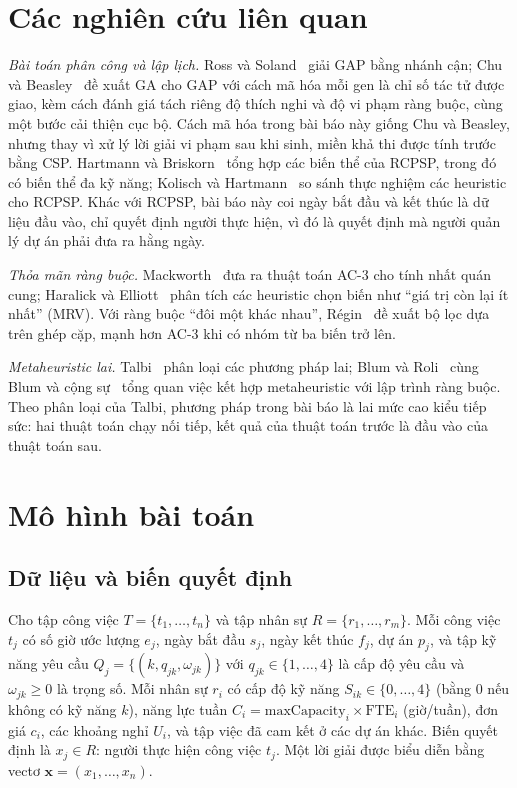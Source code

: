 \documentclass{IEEEtran}
\begin{document}
\section{Các nghiên cứu liên quan}
\label{sec:related}

\textit{Bài toán phân công và lập lịch.} Ross và Soland~\cite{ross1975} giải GAP bằng nhánh cận; Chu và Beasley~\cite{chu1997} đề xuất GA cho GAP với cách mã hóa mỗi gen là chỉ số tác tử được giao, kèm cách đánh giá tách riêng độ thích nghi và độ vi phạm ràng buộc, cùng một bước cải thiện cục bộ. Cách mã hóa trong bài báo này giống Chu và Beasley, nhưng thay vì xử lý lời giải vi phạm sau khi sinh, miền khả thi được tính trước bằng CSP. Hartmann và Briskorn~\cite{hartmann2010} tổng hợp các biến thể của RCPSP, trong đó có biến thể đa kỹ năng; Kolisch và Hartmann~\cite{kolisch2006} so sánh thực nghiệm các heuristic cho RCPSP. Khác với RCPSP, bài báo này coi ngày bắt đầu và kết thúc là dữ liệu đầu vào, chỉ quyết định người thực hiện, vì đó là quyết định mà người quản lý dự án phải đưa ra hằng ngày.

\textit{Thỏa mãn ràng buộc.} Mackworth~\cite{mackworth1977} đưa ra thuật toán AC-3 cho tính nhất quán cung; Haralick và Elliott~\cite{haralick1980} phân tích các heuristic chọn biến như ``giá trị còn lại ít nhất'' (MRV). Với ràng buộc ``đôi một khác nhau'', Régin~\cite{regin1994} đề xuất bộ lọc dựa trên ghép cặp, mạnh hơn AC-3 khi có nhóm từ ba biến trở lên.

\textit{Metaheuristic lai.} Talbi~\cite{talbi2002} phân loại các phương pháp lai; Blum và Roli~\cite{blum2003} cùng Blum và cộng sự~\cite{blum2011} tổng quan việc kết hợp metaheuristic với lập trình ràng buộc. Theo phân loại của Talbi, phương pháp trong bài báo là lai mức cao kiểu tiếp sức: hai thuật toán chạy nối tiếp, kết quả của thuật toán trước là đầu vào của thuật toán sau.

\section{Mô hình bài toán}
\label{sec:model}

\subsection{Dữ liệu và biến quyết định}

Cho tập công việc $T=\{t_1,\dots,t_n\}$ và tập nhân sự $R=\{r_1,\dots,r_m\}$. Mỗi công việc $t_j$ có số giờ ước lượng $e_j$, ngày bắt đầu $s_j$, ngày kết thúc $f_j$, dự án $p_j$, và tập kỹ năng yêu cầu $Q_j=\{(k, q_{jk}, \omega_{jk})\}$ với $q_{jk}\in\{1,\dots,4\}$ là cấp độ yêu cầu và $\omega_{jk}\ge 0$ là trọng số. Mỗi nhân sự $r_i$ có cấp độ kỹ năng $S_{ik}\in\{0,\dots,4\}$ (bằng 0 nếu không có kỹ năng $k$), năng lực tuần $C_i=\text{maxCapacity}_i\times\text{FTE}_i$ (giờ/tuần), đơn giá $c_i$, các khoảng nghỉ $U_i$, và tập việc đã cam kết ở các dự án khác. Biến quyết định là $x_j\in R$: người thực hiện công việc $t_j$. Một lời giải được biểu diễn bằng vectơ $\mathbf{x}=(x_1,\dots,x_n)$.
\end{document}
